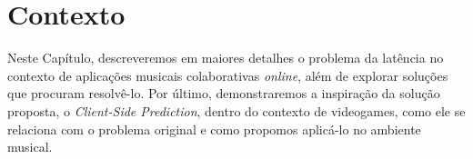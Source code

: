 \chapter{Contexto}
\label{chap:context}

Neste Capítulo, descreveremos em maiores detalhes o problema da latência no contexto de aplicações musicais colaborativas \textit{online}, além de explorar soluções que procuram resolvê-lo. Por último, demonstraremos a inspiração da solução proposta, o \textit{Client-Side Prediction}, dentro do contexto de videogames, como ele se relaciona com o problema original e como propomos aplicá-lo no ambiente musical.



